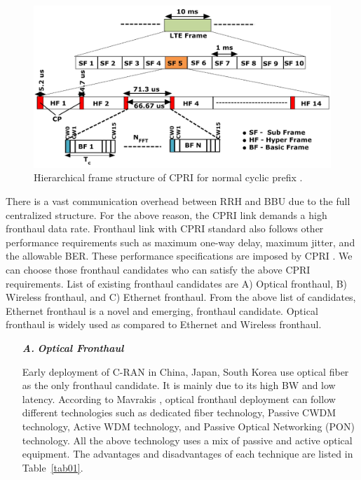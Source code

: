 \begin{multicols}{2}
\begin{figure}[H]
\centering
\includegraphics[scale=.34]{src/Figures/chap3/fig03.jpg}
\caption{Hierarchical frame structure of CPRI for normal cyclic prefix \cite{art3-key40}.}\label{fig03}
\vspace{-.5cm}
\end{figure}

There is a vast communication overhead between RRH and BBU due to the full centralized structure. For the above reason, the CPRI link demands a high fronthaul data rate. Fronthaul link with CPRI standard also follows other performance requirements such as maximum one-way delay, maximum jitter, and the allowable BER. These performance specifications are imposed by CPRI \cite{art3-key41}. We can choose those fronthaul candidates who can satisfy the above CPRI requirements. List of existing fronthaul candidates are A) Optical fronthaul, B) Wireless fronthaul, and C) Ethernet fronthaul. From the above list of candidates, Ethernet fronthaul is a novel and emerging, fronthaul candidate. Optical fronthaul is widely used as compared to Ethernet and Wireless fronthaul.

\vspace{-.3cm}

\begin{itemize}

\item[{\textit{\textbf{ A.}}}] {\textit{\textbf{Optical Fronthaul}}}

Early deployment of C-RAN in China, Japan, South Korea use optical fiber as the only fronthaul candidate. It is mainly due to its high BW and low latency. According to Mavrakis \cite{art3-key42}, optical fronthaul deployment can follow different technologies such as dedicated fiber technology, Passive CWDM technology, Active WDM technology, and Passive Optical Networking (PON) technology. All the above technology uses a mix of passive and active optical equipment. The advantages and disadvantages of each technique are listed in Table~\ref{tab01}.
\end{itemize}
\end{multicols}

